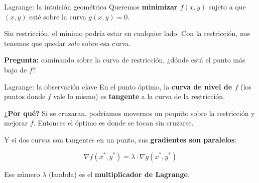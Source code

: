 \documentclass{beamer}
\begin{document}
\begin{frame}{Lagrange: la intuición geométrica}
    \small
    Queremos \textbf{minimizar $f(x, y)$} sujeto a que $(x, y)$ esté sobre la curva $g(x, y) = 0$.

    \vspace{0.5em}

    Sin restricción, el mínimo podría estar en cualquier lado. Con la restricción, nos tenemos que quedar \textit{solo} sobre esa curva.

    \vspace{0.5em}

    \textbf{Pregunta:} caminando sobre la curva de restricción, ¿dónde está el punto más bajo de $f$?
\end{frame}

\begin{frame}{Lagrange: la observación clave}
    \small
    En el punto óptimo, la \textbf{curva de nivel de $f$} (los puntos donde $f$ vale lo mismo) es \textbf{tangente} a la curva de la restricción.

    \vspace{0.5em}

    \textbf{¿Por qué?} Si se cruzaran, podríamos movernos un poquito sobre la restricción y mejorar $f$. Entonces el óptimo es donde se tocan sin cruzarse.

    \vspace{0.8em}

    Y si dos curvas son tangentes en un punto, sus \textbf{gradientes son paralelos}:

    \[
    \nabla f(x^*, y^*) = \lambda \cdot \nabla g(x^*, y^*)
    \]

    \vspace{0.5em}

    Ese número $\lambda$ (lambda) es el \textbf{multiplicador de Lagrange}.
\end{frame}
\end{document}
